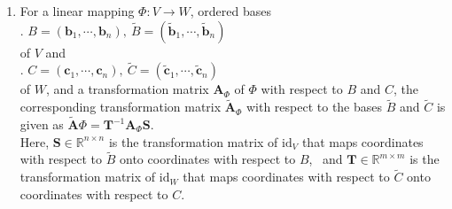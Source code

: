\begin{enumerate}
    \item
    \begin{theorem}
        For a linear mapping $\Phi : V \to W$, ordered bases
        \hfill \cite{mfml/book/mml/Deisenroth-Faisal-Ong}
        \\
        .\hfill
        $
            B = (\bm{b}_1, \cdots , \bm{b}_n), \ 
            \tilde{B} = (\tilde{\bm{b}}_1, \cdots , \tilde{\bm{b}}_n)
        $
        \hfill \cite{mfml/book/mml/Deisenroth-Faisal-Ong}
        \\
        of $V$ and
        \hfill \cite{mfml/book/mml/Deisenroth-Faisal-Ong}
        \\
        .\hfill
        $
            C = (\bm{c}_1, \cdots , \bm{c}_n), \ 
            \tilde{C} = (\tilde{\bm{c}}_1, \cdots , \tilde{\bm{c}}_n)
        $
        \hfill \cite{mfml/book/mml/Deisenroth-Faisal-Ong}
        \\
        of $W$, and a transformation matrix $\bm{A}_\Phi$ of $\Phi$ with respect to $B$ and $C$, the corresponding transformation matrix $\tilde{\bm{A}} _\Phi$ with respect to the bases $\tilde{B}$ and $\tilde{C}$ is given as
        $
            \tilde{\bm{A}} \Phi = \bm{T}^{-1}\bm{A}_\Phi \bm{S}
        $.
        \hfill \cite{mfml/book/mml/Deisenroth-Faisal-Ong}
        \\
        Here, $\bm{S} \in \mathbb{R}^{n\times n}$ is the transformation matrix of $\text{id}_V$ that maps coordinates with respect to $\tilde{B}$ onto coordinates with respect to $B$, \ 
        and $\bm{T} \in \mathbb{R}^{m\times m}$ is the transformation matrix of $\text{id}_W$ that maps coordinates with respect to $\tilde{C}$ onto coordinates with respect to $C$.
        \hfill \cite{mfml/book/mml/Deisenroth-Faisal-Ong}
    \end{theorem}


\end{enumerate}
